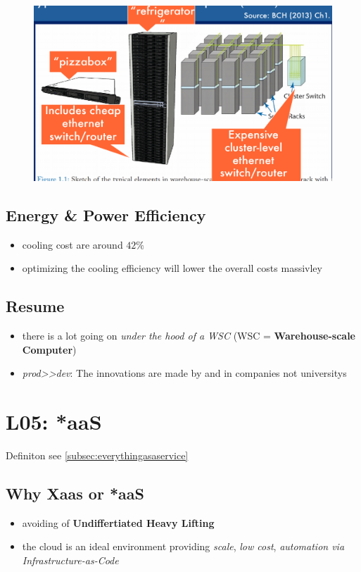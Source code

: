 \documentclass[a4paper]{article}
\begin{document}
\begin{multicols}{3}
\begin{figure}[H]
    \includegraphics[width=\linewidth]{warehousescalecomputer.png}
    \label{fig:warehousescalecomputer}
\end{figure}

\subsection*{Energy \& Power Efficiency}
\begin{itemize}
    \item cooling cost are around $42\%$
    \item optimizing the cooling efficiency will lower the overall costs massivley
\end{itemize}

\subsection*{Resume}
\begin{itemize}
    \item there is a lot going on \textit{under the hood of a WSC} (WSC = \textbf{Warehouse-scale Computer})
    \item \textit{prod>>dev}: The innovations are made by and in companies not universitys
\end{itemize}

\section*{L05: *aaS}
Definiton see \cref{subsec:everythingasaservice}

\subsection*{Why Xaas or *aaS}
\begin{itemize}
    \item avoiding of \textbf{Undiffertiated Heavy Lifting}
    \item the cloud is an ideal environment providing \textit{scale}, \textit{low cost}, \textit{automation via Infrastructure-as-Code}
\end{itemize}


\end{multicols}
\end{document}
